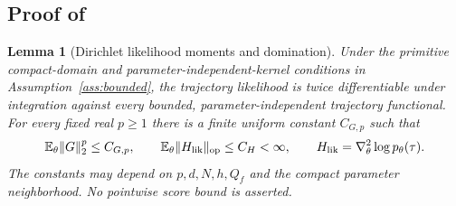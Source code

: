 \documentclass[11pt]{article}
\newtheorem{lemma}[theorem]{Lemma}
\newcommand{\E}{\mathbb E}
\newcommand{\1}{\mathbf 1}
\newcommand{\op}{\mathrm{op}}
\DeclarePairedDelimiter{\norm}{\lVert}{\rVert}
\begin{document}
\subsection{Proof of \texorpdfstring{}{the CPT gradient identity}}
\begin{lemma}[Dirichlet likelihood moments and domination]\label{lem:dirichlet-moments}
Under the primitive compact-domain and parameter-independent-kernel conditions in Assumption~\ref{ass:bounded}, the trajectory likelihood is twice differentiable under integration against every bounded, parameter-independent trajectory functional. For every fixed real $p\ge1$ there is a finite uniform constant $C_{G,p}$ such that
\[
 \E_\theta\norm{G}_2^p\le C_{G,p},\qquad
 \E_\theta\norm{H_{\rm lik}}_{\op}\le C_H<\infty,
 \qquad H_{\rm lik}=\nabla_\theta^2\log p_\theta(\tau).
\]
The constants may depend on $p,d,N,h,Q_f$ and the compact parameter neighborhood. No pointwise score bound is asserted.
\end{lemma}
\end{document}
